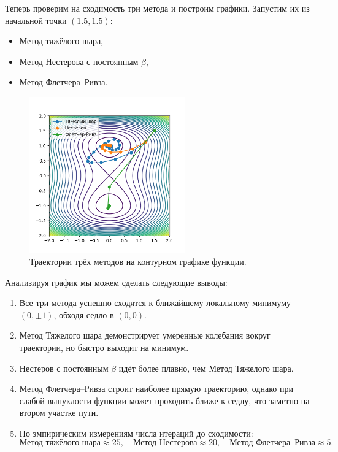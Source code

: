 \documentclass[a4paper]{article}
\begin{document}
Теперь проверим на сходимость три метода и построим графики. Запустим их из начальной точки \((1.5,1.5)\):
\begin{itemize}
  \item Метод тяжёлого шара,
  \item Метод Нестерова с постоянным \(\beta\),
  \item Метод Флетчера–Ривза.
\end{itemize}

\begin{figure}[H]
  \centering
  \includegraphics[width=0.6\textwidth]{images/task2_paths.png}
  \caption{Траектории трёх методов на контурном графике функции.}
  \label{fig:task2_paths}
\end{figure}

Анализируя график мы можем сделать следующие выводы:

\begin{enumerate}
  \item Все три метода успешно сходятся к ближайшему локальному минимуму \((0,\pm1)\), обходя седло в \((0,0)\).
  \item Метод Тяжелого шара демонстрирует умеренные колебания вокруг траектории, но быстро выходит на минимум.
  \item Нестеров с постоянным \(\beta\) идёт более плавно, чем Метод Тяжелого шара.
  \item Метод Флетчера–Ривза строит наиболее прямую траекторию, однако при слабой выпуклости функции может проходить ближе к седлу, что заметно на втором участке пути.
  \item По эмпирическим измерениям числа итераций до сходимости:
  \[
    \text{Метод тяжёлого шара}\approx 25,\quad
    \text{Метод Нестерова}\approx 20,\quad
    \text{Метод Флетчера–Ривза}\approx 5.
  \]
\end{enumerate}
\end{document}
